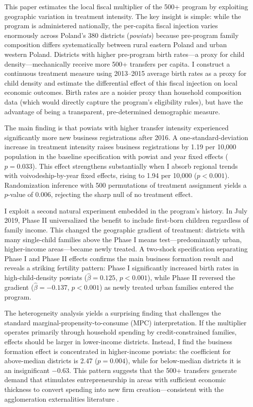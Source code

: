 \documentclass[12pt]{article}
\begin{document}
This paper estimates the local fiscal multiplier of the 500+ program by exploiting geographic variation in treatment intensity. The key insight is simple: while the program is administered nationally, the per-capita fiscal injection varies enormously across Poland's 380 districts (\emph{powiats}) because pre-program family composition differs systematically between rural eastern Poland and urban western Poland. Districts with higher pre-program birth rates---a proxy for child density---mechanically receive more 500+ transfers per capita. I construct a continuous treatment measure using 2013--2015 average birth rates as a proxy for child density and estimate the differential effect of this fiscal injection on local economic outcomes. Birth rates are a noisier proxy than household composition data (which would directly capture the program's eligibility rules), but have the advantage of being a transparent, pre-determined demographic measure.

The main finding is that powiats with higher transfer intensity experienced significantly more new business registrations after 2016. A one-standard-deviation increase in treatment intensity raises business registrations by 1.19 per 10,000 population in the baseline specification with powiat and year fixed effects ($p = 0.033$). This effect strengthens substantially when I absorb regional trends with voivodeship-by-year fixed effects, rising to 1.94 per 10,000 ($p < 0.001$). Randomization inference with 500 permutations of treatment assignment yields a $p$-value of 0.006, rejecting the sharp null of no treatment effect.

I exploit a second natural experiment embedded in the program's history. In July 2019, Phase II universalized the benefit to include first-born children regardless of family income. This changed the geographic gradient of treatment: districts with many single-child families above the Phase I means test---predominantly urban, higher-income areas---became newly treated. A two-shock specification separating Phase I and Phase II effects confirms the main business formation result and reveals a striking fertility pattern: Phase I significantly increased birth rates in high-child-density powiats ($\hat{\beta} = 0.125$, $p < 0.001$), while Phase II reversed the gradient ($\hat{\beta} = -0.137$, $p < 0.001$) as newly treated urban families entered the program.

The heterogeneity analysis yields a surprising finding that challenges the standard marginal-propensity-to-consume (MPC) interpretation. If the multiplier operates primarily through household spending by credit-constrained families, effects should be larger in lower-income districts. Instead, I find the business formation effect is concentrated in higher-income powiats: the coefficient for above-median districts is 2.47 ($p = 0.004$), while for below-median districts it is an insignificant $-0.63$. This pattern suggests that the 500+ transfers generate demand that stimulates entrepreneurship in areas with sufficient economic thickness to convert spending into new firm creation---consistent with the agglomeration externalities literature \citep{glaeser2010complementarity, greenstone2010identifying}.
\end{document}

